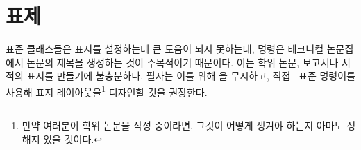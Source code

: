 \chapter{표제}

표준 클래스들은 표지를 설정하는데 큰 도움이 되지 못하는데, \cmd{\maketitle}
명령은 테크니컬 논문집에서 논문의 제목을 생성하는 것이 주목적이기 때문이다.
이는 학위 논문, 보고서나 서적의 표지를 만들기에 불충분하다.
필자는 이를 위해 \cmd{\maketitle}을 무시하고, 직접 \ltx\ 표준 명령어를
사용해 표지 레이아웃을\footnote{만약 여러분이 학위 논문을 작성 중이라면, 그것이
어떻게 생겨야 하는지 아마도 정해져 있을 것이다.}
디자인할 것을 권장한다.

